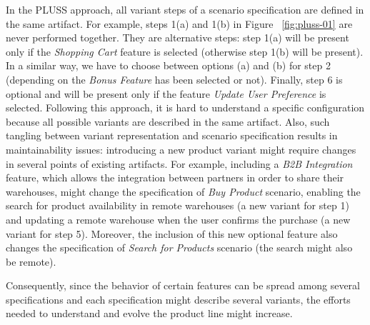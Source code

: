 \documentclass{llncs}
\begin{document}
In the PLUSS approach, all variant steps of a scenario specification are defined in the same artifact. For example, steps 1(a) and 1(b) in Figure ~\ref{fig:pluss-01} are 
never performed together. They are alternative steps: step 1(a) will be present only if the \emph{Shopping Cart} feature is selected (otherwise step 1(b) will be present). In a similar way, we have to choose between options (a) and (b) for step 2 (depending on the \emph{Bonus Feature} has been selected or not). Finally, step 6 is optional and will be present only if the feature \emph{Update User Preference} is selected. Following this approach, it is hard to understand a specific configuration because all possible variants are described in the same artifact. Also, such tangling between variant representation and scenario specification results in maintainability issues: introducing a new product variant might require changes in several points of existing artifacts.  For example, including a \emph{B2B Integration} feature, which allows the integration between partners in order to share their warehouses, might change the specification of \emph{Buy Product} scenario, enabling the search for product availability in remote warehouses (a new variant for step 1) and updating a remote warehouse when the user confirms the purchase (a new variant for step 5). Moreover, the inclusion of this new optional feature also changes the specification of \emph{Search for Products} scenario (the search might also be remote). 

Consequently, since the behavior of certain features can be spread among several specifications and each specification might describe several variants, the efforts needed to understand and evolve the product line might increase.    
\end{document}
